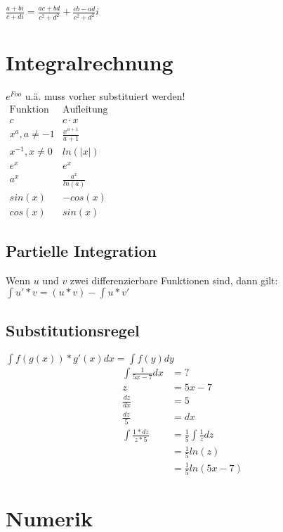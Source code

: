 \documentclass[a4paper,landscape, 11pt]{article}
\begin{document}
\begin{multicols}{4}
\begin{small}
        $\displaystyle \frac{a + bi}{c + di} = \frac{ac + bd}{c^2 + d^2} + \frac{cb - ad}{c^2 + d^2}i$
    
         
    \section{Integralrechnung}
        $e^{Foo}$ u.ä. muss vorher substituiert werden!\\
        
        $
        \begin{matrix}
        \text{Funktion} & \text{Aufleitung} \\
        c & c \cdot x \\
        x^a, a \neq -1 & \frac{x^{a+1}}{a+1}\\
        x^{-1}, x \neq 0 & ln(|x|)\\
        e^x & e^x \\
        a^x & \frac{a^x}{ln(a)} \\
        sin(x) & -cos(x)\\
        cos(x) & sin(x)
        \end{matrix}
        $
        
        
        \subsection{Partielle Integration}
        Wenn $u$ und $v$ zwei differenzierbare Funktionen sind, dann gilt: \\
        $\int u' * v = (u * v) - \int u * v'$
        \subsection{Substitutionsregel}
        $\int f(g(x)) * g'(x) dx = \int f(y) dy$
        \begin{align}
            \int \frac{1}{5x - 7} dx &= ?\\
            z &= 5x - 7 \\
            \frac{dz}{dx} &= 5 \\   
            \frac{dz}{5} &= dx  \\
            \int \frac{1 * dz}{z * 5} &= \frac{1}{5} \int \frac{1}{z} dz \\
                                      &= \frac{1}{5} ln(z) \\
                                      &= \frac{1}{5} ln(5x-7)
        \end{align}
	\section{Numerik}

\end{small}
\end{multicols}
\end{document}
